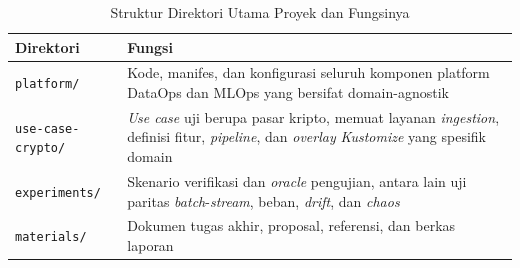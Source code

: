 \begin{table}[!htb]
\centering
\caption{Struktur Direktori Utama Proyek dan Fungsinya}
\label{tab:struktur-direktori}
\footnotesize
\setlength{\tabcolsep}{3pt}
\begin{tabular}{|>{\raggedright\arraybackslash}m{3.1cm}|>{\raggedright\arraybackslash}m{10.4cm}|}
\hline
\centering\arraybackslash\textbf{Direktori} & \centering\arraybackslash\textbf{Fungsi} \\
\hline
\texttt{platform/} & Kode, manifes, dan konfigurasi seluruh komponen platform DataOps dan MLOps yang bersifat domain-agnostik \\
\hline
\texttt{use-case-crypto/} & \textit{Use case} uji berupa pasar kripto, memuat layanan \textit{ingestion}, definisi fitur, \textit{pipeline}, dan \textit{overlay} \textit{Kustomize} yang spesifik domain \\
\hline
\texttt{experiments/} & Skenario verifikasi dan \textit{oracle} pengujian, antara lain uji paritas \textit{batch}-\textit{stream}, beban, \textit{drift}, dan \textit{chaos} \\
\hline
\texttt{materials/} & Dokumen tugas akhir, proposal, referensi, dan berkas laporan \\
\hline
\end{tabular}
\end{table}
